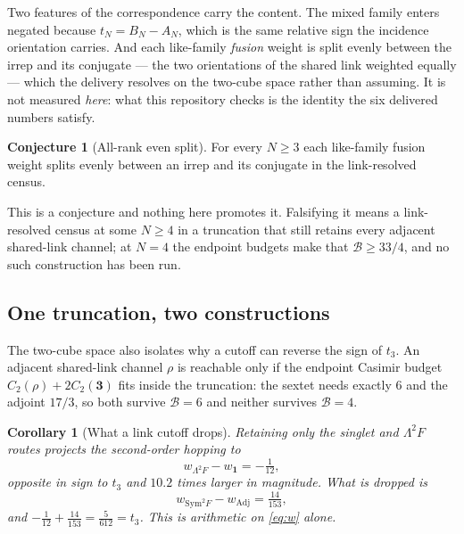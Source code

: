 \documentclass[11pt]{article}
\theoremstyle{plain}
\newtheorem{corollary}[theorem]{Corollary}
\theoremstyle{definition}
\newtheorem{conjecture}[theorem]{Conjecture}
\theoremstyle{remark}
\newcommand{\chk}[1]{}
\begin{document}
Two features of the correspondence carry the content. The mixed family enters
negated because $t_N=B_N-A_N$, which is the same relative sign the incidence
orientation carries. And each like-family \emph{fusion} weight is split evenly
between the irrep and its conjugate --- the two orientations of the shared link
weighted equally --- which the delivery resolves on the two-cube space rather
than assuming. It is not measured \emph{here}: what this repository checks is
the identity the six delivered numbers satisfy.

\begin{conjecture}[All-rank even split]\label{conj:split}
For every $N\ge3$ each like-family fusion weight splits evenly between an
irrep and its conjugate in the link-resolved census.
\end{conjecture}

\noindent This is a conjecture and nothing here promotes it. Falsifying it
means a link-resolved census at some $N\ge4$ in a truncation that still
retains every adjacent shared-link channel; at $N=4$ the endpoint budgets make
that $\mathcal B\ge33/4$, and no such construction has been run.

\subsection{One truncation, two constructions}

The two-cube space also isolates why a cutoff can reverse the sign of $t_3$.
An adjacent shared-link channel $\rho$ is reachable only if the endpoint
Casimir budget $C_2(\rho)+2C_2(\mathbf 3)$ fits inside the truncation: the
sextet needs exactly $6$ and the adjoint $17/3$, so both survive
$\mathcal B=6$ and neither survives $\mathcal B=4$.
\chk{B=6 retains every adjacent shared-link channel; B=4 provably cannot}

\begin{corollary}[What a link cutoff drops]\label{cor:cutoff}
Retaining only the singlet and $\Lambda^2F$ routes projects the second-order
hopping to
\[
  w_{\Lambda^2F}-w_{\mathbf 1}=-\tfrac1{12},
\]
opposite in sign to $t_3$ and $10.2$ times larger in magnitude. What is
dropped is
\[
  w_{\mathrm{Sym}^2F}-w_{\mathrm{Adj}}=\tfrac{14}{153},
\]
and $-\tfrac1{12}+\tfrac{14}{153}=\tfrac5{612}=t_3$. This is arithmetic on
\eqref{eq:w} alone.
\end{corollary}
\end{document}
